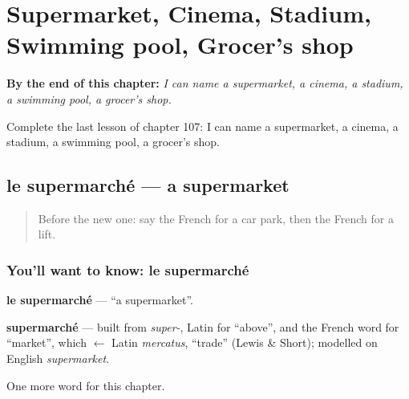 
\chapter{Supermarket, Cinema, Stadium, Swimming pool, Grocer's shop}
\label{ch:fr-supermarket-cinema-stadium-swimming-pool-grocer-s-shop}

\begin{chapteropening}
\textbf{By the end of this chapter:} \emph{I can name a supermarket, a cinema, a stadium, a swimming pool, a grocer's shop.}

Complete the last lesson of chapter 107: I can name a supermarket, a cinema, a stadium, a swimming pool, a grocer's shop.
\end{chapteropening}

\section[le supermarché]{le supermarché — a supermarket}

\label{lesson:FR-C107-supermarche}



\begin{quote}
Before the new one: say the French for a car park, then the French for a lift.
\end{quote}

\subsection*{You'll want to know: le supermarché}
\textbf{le supermarché} — \textquotedblleft{}a supermarket\textquotedblright{}.

\begin{cousinweb}
\textbf{supermarché} — built from \emph{super-}, Latin for \textquotedblleft{}above\textquotedblright{}, and the French word for \textquotedblleft{}market\textquotedblright{}, which $\leftarrow$ Latin \emph{mercatus}, \textquotedblleft{}trade\textquotedblright{} (Lewis \& Short); modelled on English \emph{supermarket}.
\end{cousinweb}

\begin{grammarlens}[title={What you've built}]
One more word for this chapter.
\end{grammarlens}

